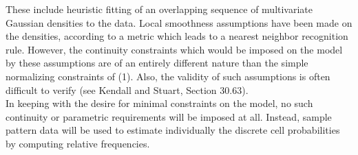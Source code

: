 \documentclass[10pt, a4paper]{article}
\begin{document}
\begin{CJK*}{UTF8}{bsmi}
\begin{multicols}{2}
These include heuristic fitting of an overlapping sequence of multivariate Gaussian densities to the data.
Local smoothness assumptions have been made on the densities, according to a metric which leads to a nearest neighbor recognition rule.
However, the continuity constraints which would be imposed on the model by these assumptions are of an entirely different nature than the simple normalizing constraints of (1). Also, the validity of such assumptions is often difficult to verify (see Kendall and Stuart, Section 30.63). \\
\hspace{1em} In keeping with the desire for minimal constraints on the model, no such continuity or parametric requirements will be imposed at all. 
Instead, sample pattern data will be used to estimate individually the discrete cell probabilities by computing relative frequencies. \\


\end{multicols}
\end{CJK*}
\end{document}
